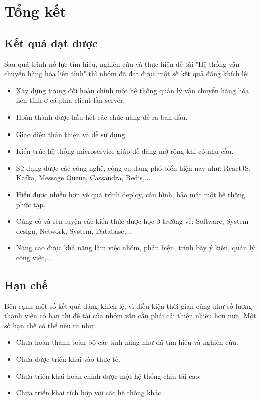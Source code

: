 \chapter{Tổng kết}\label{chap:result}
	\section{Kết quả đạt được}
	Sau quá trình nố lực tìm hiểu, nghiên cứu và thực hiện đề tài "Hệ thống vận chuyển hàng hóa liên tỉnh" thì nhóm đã đạt được một số kết quả đáng khích lệ:
	
	\begin{itemize}
		\item Xây dựng tương đối hoàn chỉnh một hệ thống quản lý vận chuyển hàng hóa liên tỉnh ở cả phía client lẫn server.
		\item Hoàn thành được hầu hết các chức năng đề ra ban đầu.
		\item Giao diện thân thiện và dễ sử dụng.
		\item Kiến trúc hệ thống microservice giúp dễ dàng mở rộng khi có nhu cầu.
		\item Sử dụng được các công nghệ, công cụ đang phổ biển hiện nay như: ReactJS, Kafka, Message Queue, Cassandra, Redis,... 
		\item Hiểu đươc nhiều hơn về quá trình deploy, cấu hình, bảo mật một hệ thống phức tạp.
		\item Củng cố và rèn luyện các kiến thức được học ở trường về: Software, System design, Network, System, Database,...
		\item Nâng cao được khả năng làm việc nhóm, phản biện, trình bày ý kiến, quản lý công việc,...
	\end{itemize} 
	
	
	\section{Hạn chế}
	
	Bên cạnh một số kết quả đáng khích lệ, vì điều kiện thời gian cũng như số lượng thành viên có hạn thì đề tài của nhóm vẫn cần phải cải thiện nhiều hơn nữa. Một số hạn chế có thể nêu ra như:


	\begin{itemize}
		\item Chưa hoàn thành toàn bộ các tính năng như đã tìm hiểu và nghiên cứu.
		\item Chưa được triển khai vào thực tế.
		\item Chưa triển khai hoàn chỉnh được một hệ thống chịu tải cao.
		\item Chưa triển khai tích hợp với các hệ thống khác.
	\end{itemize}
	

